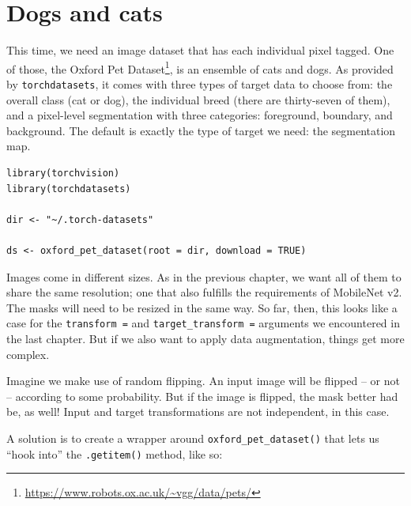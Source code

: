 \documentclass[
  letterpaper,
]{krantz}
\DeclareRobustCommand{\href}[2]{#2\footnote{\url{#1}}}
\begin{document}
\hypertarget{dogs-and-cats}{%
\section{Dogs and cats}\label{dogs-and-cats}}

This time, we need an image dataset that has each individual pixel
tagged. One of those, the
\href{https://www.robots.ox.ac.uk/~vgg/data/pets/}{Oxford Pet Dataset},
is an ensemble of cats and dogs. As provided by \texttt{torchdatasets},
it comes with three types of target data to choose from: the overall
class (cat or dog), the individual breed (there are thirty-seven of
them), and a pixel-level segmentation with three categories: foreground,
boundary, and background. The default is exactly the type of target we
need: the segmentation map.

\begin{verbatim}
library(torchvision)
library(torchdatasets)

dir <- "~/.torch-datasets"

ds <- oxford_pet_dataset(root = dir, download = TRUE)
\end{verbatim}

Images come in different sizes. As in the previous chapter, we want all
of them to share the same resolution; one that also fulfills the
requirements of MobileNet v2. The masks will need to be resized in the
same way. So far, then, this looks like a case for the
\texttt{transform\ =} and \texttt{target\_transform\ =} arguments we
encountered in the last chapter. But if we also want to apply data
augmentation, things get more complex.

Imagine we make use of random flipping. An input image will be flipped
-- or not -- according to some probability. But if the image is flipped,
the mask better had be, as well! Input and target transformations are
not independent, in this case.

A solution is to create a wrapper around \texttt{oxford\_pet\_dataset()}
that lets us ``hook into'' the \texttt{.getitem()} method, like so:
\end{document}
